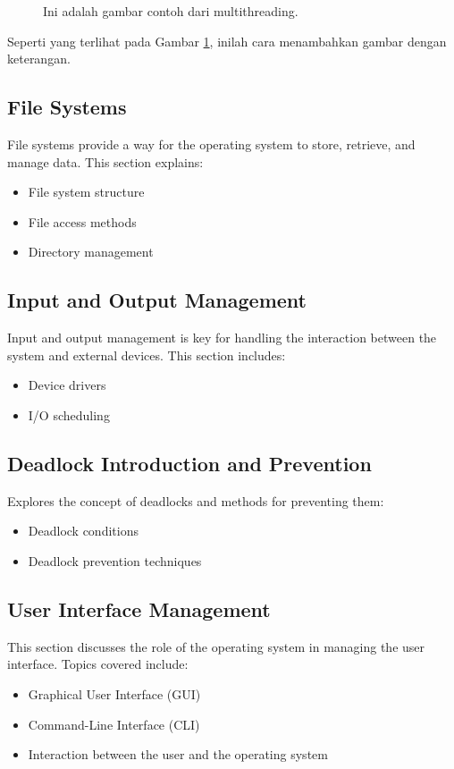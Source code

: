 \documentclass[12pt]{article}
\begin{document}
\begin{figure}[h]
    \centering
    \caption{Ini adalah gambar contoh dari multithreading.}
    \label{fig:contoh_gambar}
\end{figure}

Seperti yang terlihat pada Gambar \ref{fig:contoh_gambar}, inilah cara menambahkan gambar dengan keterangan.

\subsection{File Systems}
File systems provide a way for the operating system to store, retrieve, and manage data. This section explains:
\begin{itemize}
    \item File system structure
    \item File access methods
    \item Directory management
\end{itemize}

\subsection{Input and Output Management}
Input and output management is key for handling the interaction between the system and external devices. This section includes:
\begin{itemize}
    \item Device drivers
    \item I/O scheduling
\end{itemize}

\subsection{Deadlock Introduction and Prevention}
Explores the concept of deadlocks and methods for preventing them:
\begin{itemize}
    \item Deadlock conditions
    \item Deadlock prevention techniques
\end{itemize}

\subsection{User Interface Management}
This section discusses the role of the operating system in managing the user interface. Topics covered include:
\begin{itemize}
    \item Graphical User Interface (GUI)
    \item Command-Line Interface (CLI)
    \item Interaction between the user and the operating system
\end{itemize}
\end{document}
